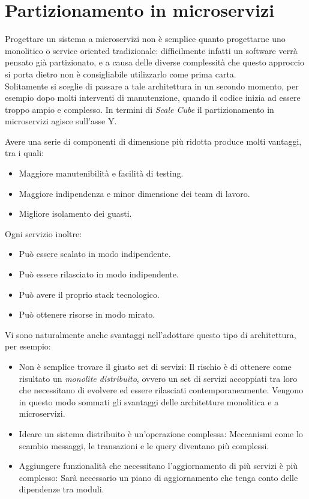 \section{Partizionamento in microservizi}
Progettare un sistema a microservizi non è semplice quanto progettarne uno monolitico o service oriented tradizionale: difficilmente infatti un software verrà pensato già partizionato, e a causa delle diverse complessità che questo approccio si porta dietro non è consigliabile utilizzarlo come prima carta.\\
Solitamente si sceglie di passare a tale architettura in un secondo momento, per esempio dopo molti interventi di manutenzione, quando il codice inizia ad essere troppo ampio e complesso.\cite{microservices_architecture}
In termini di \textit{Scale Cube} il partizionamento in microservizi agisce sull'asse Y.

Avere una serie di componenti di dimensione più ridotta produce molti vantaggi, tra i quali:
\begin{itemize}
	\item Maggiore manutenibilità e facilità di testing.
	\item Maggiore indipendenza e minor dimensione dei team di lavoro.
	\item Migliore isolamento dei guasti.
\end{itemize}

Ogni servizio inoltre:
\begin{itemize}
	\item Può essere scalato in modo indipendente.
	\item Può essere rilasciato in modo indipendente.
	\item Può avere il proprio stack tecnologico.
	\item Può ottenere risorse in modo mirato.
\end{itemize}

Vi sono naturalmente anche svantaggi nell'adottare questo tipo di architettura, per esempio:
\begin{itemize}
	\item Non è semplice trovare il giusto set di servizi: Il rischio è di ottenere come risultato un \textit{monolite distribuito}, ovvero un set di servizi accoppiati tra loro che necessitano di evolvere ed essere rilasciati contemporaneamente.
	Vengono in questo modo sommati gli svantaggi delle architetture monolitica e a microservizi.
	\item Ideare un sistema distribuito è un'operazione complessa: Meccanismi come lo scambio messaggi, le transazioni e le query diventano più complessi.
	\item Aggiungere funzionalità che necessitano l'aggiornamento di più servizi è più complesso: Sarà necessario un piano di aggiornamento che tenga conto delle dipendenze tra moduli.
\end{itemize}


